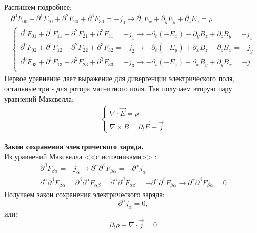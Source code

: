 \documentclass[__main__.tex]{subfiles}
\begin{document}
Распишем подробнее:
\begin{gather*}
\partial^0F_{00} + \partial^1F_{10} + \partial^2 F_{20} + \partial^3F_{30} = -j_0 \rightarrow \partial_x E_x + \partial_y E_y + \partial_z E_z = \rho\\
\begin{cases}
\partial^0F_{01} + \partial^1F_{11} + \partial^2 F_{21} + \partial^3F_{31} = -j_1 \rightarrow -\partial_t(- E_x) - \partial_y B_z + \partial_z B_y = -j_x\\
\partial^0F_{02} + \partial^1F_{12} + \partial^2 F_{22} + \partial^3F_{32} = -j_2 \rightarrow -\partial_t(- E_y) + \partial_x B_z - \partial_z B_x = -j_y\\
\partial^0F_{03} + \partial^1F_{13} + \partial^2 F_{23} + \partial^3F_{33} = -j_3 \rightarrow -\partial_t(- E_z) - \partial_x B_y + \partial_y B_x = -j_z\\
\end{cases}
\end{gather*}
Первое уравнение дает выражение для дивергенции электрического поля, остальные три - для ротора магнитного поля. Так получаем вторую пару уравнений Максвелла:
\begin{gather*}
\begin{cases}
\nabla \cdot \vec E = \rho\\
\nabla \times \vec B = \partial_t \vec E + \vec j
\end{cases}
\end{gather*}

\textbf{Закон сохранения электрического заряда.}\\
Из уравнений Максвелла <<с источниками>> :
\begin{gather*}
\partial^\beta F_{\beta\alpha} = -j_\alpha \longrightarrow \partial^\alpha\partial^\beta F_{\beta\alpha} = -\partial^\alpha j_\alpha\\
\partial^\alpha\partial^\beta F_{\beta\alpha} = \partial^\beta\partial^\alpha F_{\alpha\beta} = \partial^\alpha\partial^\beta F_{\alpha\beta} = - \partial^\alpha\partial^\beta F_{\beta\alpha} \longrightarrow \partial^\alpha\partial^\beta F_{\beta\alpha} = 0
\end{gather*}
Получаем закон сохранения электрического заряда:
$$\partial^\alpha j_\alpha = 0,$$
или:
$$\partial_t\rho + \nabla \cdot \vec j = 0$$
\end{document}
